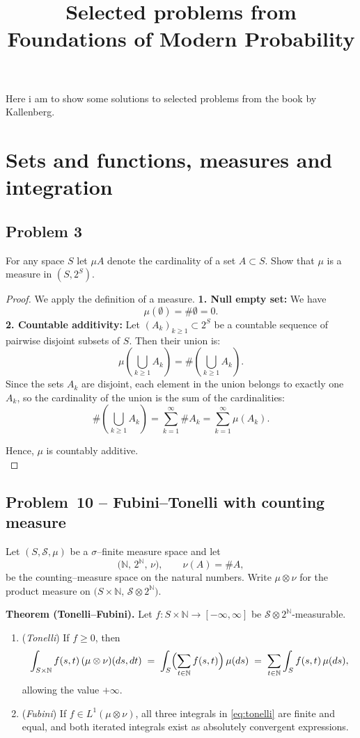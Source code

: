 \documentclass[11pt]{article}
\begin{document}
\title{Selected problems from Foundations of Modern Probability}
Here i am to show some solutions to selected problems from the book by Kallenberg.

\section{Sets and functions, measures and integration}
\subsection*{Problem 3}
For any space $S$ let $\mu A$ denote the cardinality of a set $A \subset S$. Show that $\mu$ is a measure in $(S, 2^S)$.
\begin{proof}
We apply the definition of a measure.
\textbf{1. Null empty set:}  
We have
\[
\mu(\emptyset) = \#\emptyset = 0.
\]
\textbf{2. Countable additivity:}  
Let \( (A_k)_{k \geq 1} \subset 2^S \) be a countable sequence of pairwise disjoint subsets of \( S \). Then their union is:
\[
\mu\left( \bigcup_{k \geq 1} A_k \right) = \#\left( \bigcup_{k \geq 1} A_k \right).
\]
Since the sets \( A_k \) are disjoint, each element in the union belongs to exactly one \( A_k \), so the cardinality of the union is the sum of the cardinalities:
\[
\#\left( \bigcup_{k \geq 1} A_k \right) = \sum_{k=1}^\infty \#A_k = \sum_{k=1}^\infty \mu(A_k).
\]

Hence, \( \mu \) is countably additive.  \\
\end{proof}


\subsection*{Problem 10 -- Fubini--Tonelli with counting measure}

Let $(S,\mathcal{S},\mu)$ be a $\sigma$--finite measure space and let
\[
\bigl(\mathbb{N},\,2^{\mathbb{N}},\,\nu\bigr), \qquad \nu(A)=\#A,
\]
be the counting--measure space on the natural numbers.
Write $\mu\otimes\nu$ for the product measure on
$\bigl(S\times\mathbb{N},\,\mathcal{S}\otimes 2^{\mathbb{N}}\bigr)$.

\medskip
\textbf{Theorem (Tonelli--Fubini).}\;
Let \(f:S\times\mathbb{N}\to[-\infty,\infty]\) be
\(\mathcal{S}\otimes 2^{\mathbb{N}}\)-measurable.

\begin{enumerate}[label=(\roman*)]
\item (\emph{Tonelli}) If \(f\ge 0\), then
\begin{equation}\label{eq:tonelli}
   \int_{S\times\mathbb{N}} f(s,t)\,(\mu\otimes\nu)(ds,dt)
   \;=\;
   \int_S \Bigl(\sum_{t\in\mathbb{N}} f(s,t)\Bigr)\,\mu(ds)
   \;=\;
   \sum_{t\in\mathbb{N}} \int_S f(s,t)\,\mu(ds),
\end{equation}
allowing the value \(+\infty\).

\item (\emph{Fubini}) If \(f\in L^{1}(\mu\otimes\nu)\),  
all three integrals in \eqref{eq:tonelli} are finite and equal, and both
iterated integrals exist as absolutely convergent expressions.
\end{enumerate}
\end{document}
